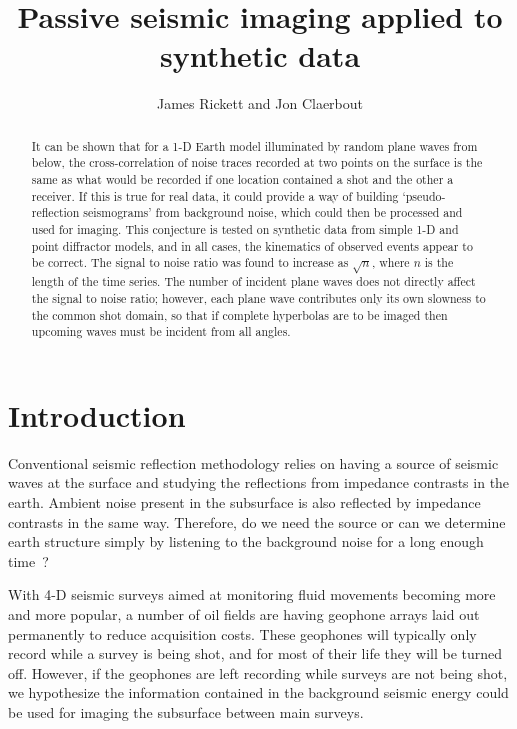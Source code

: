 

\title{Passive seismic imaging applied to synthetic data}


\author{James Rickett and Jon Claerbout}
\maketitle

\begin{abstract}
It can be shown that for a 1-D Earth model illuminated by random plane waves
from below, the cross-correlation of noise traces recorded at two points on the
surface is the same as what would be recorded if one location contained a
shot and the other a receiver. If this is true for real data, it could
provide a way of building `pseudo-reflection seismograms' from background
noise, which could then be processed and used for imaging.
This conjecture is tested on synthetic data from simple 
1-D and point diffractor models,
and in all cases, the kinematics of observed events 
appear to be correct. 
The signal to noise ratio was found to increase as $\sqrt{n}$, where $n$ is
the length of the time series. The number of incident 
plane waves does not directly affect the signal to noise ratio; however,
each plane wave contributes only its own slowness to the common 
shot domain, so that if complete hyperbolas are to be imaged 
then upcoming waves must be incident from all angles. 
\end{abstract}

\section{Introduction}
Conventional seismic reflection methodology relies on having a source
of seismic waves at the surface and studying the reflections from  
impedance contrasts in the earth. 
Ambient noise present in the subsurface is also reflected by impedance 
contrasts in the same way. Therefore, do we need the source or can we 
determine earth structure simply by listening to the 
background noise for a long enough time~?  

With 4-D seismic surveys aimed at monitoring fluid movements becoming more and 
more popular, a number of oil fields are having geophone arrays laid out 
permanently to reduce acquisition costs.  These geophones will 
typically only record while a survey is being shot, and for most of their 
life they will be turned off.  However, if the geophones are left recording 
while surveys are not being shot, we hypothesize the information 
contained in the background seismic energy could be used for imaging the 
subsurface between main surveys.

